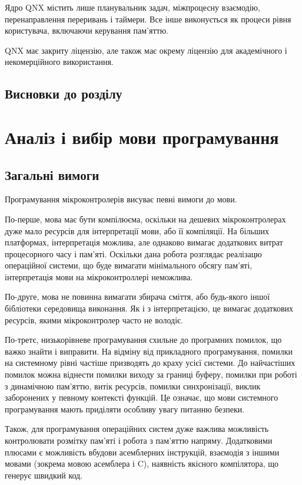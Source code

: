 \documentclass[oneside,14pt,a4paper,final]{myextreport}
\newcommand{\specialsection}[1]{\section*{#1}\addcontentsline{toc}{section}{#1}}
\newcommand{\chapterconslusions}{
  \specialsection{Висновки до розділу \thechapter}
}
\begin{document}
Ядро QNX містить лише планувальник задач, міжпроцесну взаємодію, перенаправлення переривань і таймери. Все інше виконується як процеси рівня користувача, включаючи керування пам'яттю.

QNX має закриту ліцензію, але також має окрему ліцензію для академічного і некомерційного використання\cite{qnx:noncommercial}.


\chapterconslusions{}

\chapter{Аналіз і вибір мови програмування}

\newcommand\LangC{C}

\section{Загальні вимоги}

Програмування мікроконтролерів висуває певні вимоги до мови.

По-перше, мова має бути компілюєма, оскільки на дешевих мікроконтролерах дуже мало ресурсів для інтерпретації мови, або її компіляції. На більших платформах, інтерпретація можлива, але однаково вимагає додаткових витрат процесорного часу і пам'яті. Оскільки дана робота розглядає реалізацю операційної системи, що буде вимагати мінімального обсягу пам'яті, інтерпретація мови на мікроконтроллері неможлива.

По-друге, мова не повинна вимагати збирача сміття, або будь-якого іншої бібліотеки середовища виконання. Як і з інтерпретацією, це вимагає додаткових ресурсів, якими мікроконтролер часто не володіє.

По-третє, низькорівневе програмування схильне до програмних помилок, що важко знайти і виправити. На відміну від прикладного програмування, помилки на системному рівні частіше призводять до краху усієї системи. До найчастіших помилок можна віднести помилки виходу за границі буферу, помилки при роботі з динамічною пам'яттю, витік ресурсів, помилки синхронізації, виклик заборонених у певному контексті функцій. Це означає, що мови системного програмування мають приділяти особливу увагу питанню безпеки.

Також, для програмування операційних систем дуже важлива можливість контролювати розмітку пам'яті і робота з пам'яттю напряму. Додатковими плюсами є можливість вбудови асемблерних інструкцій, взаємодія з іншими мовами (зокрема мовою асемблера і \LangC{}), наявність якісного компілятора, що генерує швидкий код.
\end{document}
